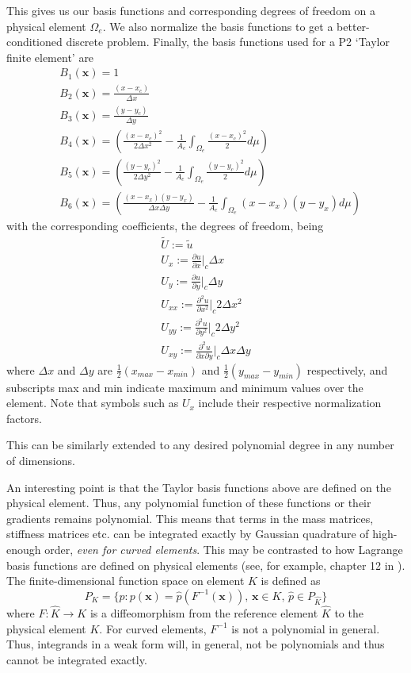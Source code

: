 \documentclass[11pt]{article}
\let\bld\boldsymbol
\begin{document}
This gives us our basis functions and corresponding degrees of freedom on a physical element $\Omega_e$. We also normalize the basis functions to get a better-conditioned discrete problem. Finally, the basis functions used for a P2 `Taylor finite element' are
\begin{align}
&B_1(\bld{x}) = 1 \\
&B_2(\bld{x}) = \frac{(x-x_c)}{\Delta x} \\
&B_3(\bld{x}) = \frac{(y-y_c)}{\Delta y} \\
&B_4(\bld{x}) = \left( \frac{(x-x_c)^2}{2\Delta x^2} - \frac{1}{A_e}\int_{\Omega_e} \frac{(x-x_c)^2}{2}d\mu \right) \\
&B_5(\bld{x}) = \left( \frac{(y-y_c)^2}{2\Delta y^2} -\frac{1}{A_e}\int_{\Omega_e} \frac{(y-y_c)^2}{2}d\mu \right) \\
&B_6(\bld{x}) = \left( \frac{(x-x_x)(y-y_x)}{\Delta x\Delta y} - \frac{1}{A_e}\int_{\Omega_e} (x-x_x)(y-y_x)d\mu \right)
\end{align}
with the corresponding coefficients, the degrees of freedom, being
\begin{align}
\tilde{U} := \tilde{u} \\
U_x := \frac{\partial u}{\partial x}\Big|_c \Delta x \\
U_y := \frac{\partial u}{\partial y}\Big|_c \Delta y \\
U_{xx} := \frac{\partial^2 u}{\partial x^2}\Big|_c 2\Delta x^2 \\
U_{yy} := \frac{\partial^2 u}{\partial y^2}\Big|_c 2\Delta y^2 \\
U_{xy} := \frac{\partial^2 u}{\partial x\partial y}\Big|_c \Delta x\Delta y
\end{align}
where $\Delta x$ and $\Delta y$ are $\frac12 (x_{max}-x_{min})$ and $\frac12 (y_{max}-y_{min})$ respectively, and subscripts max and min indicate maximum and minimum values over the element. Note that symbols such as $U_x$ include their respective normalization factors.

This can be similarly extended to any desired polynomial degree in any number of dimensions.

An interesting point is that the Taylor basis functions above are defined on the physical element. Thus, any polynomial function of these functions or their gradients remains polynomial. This means that terms in the mass matrices, stiffness matrices etc. can be integrated exactly by Gaussian quadrature of high-enough order, \emph{even for curved elements}. This may be contrasted to how Lagrange basis functions are defined on physical elements (see, for example, chapter 12 in \cite{claesjohnson}). The finite-dimensional function space on element $K$ is defined as
\begin{equation}
P_K = \{ p: p(\bld{x}) = \hat{p}(F^{-1}(\bld{x})),\, \bld{x} \in K,\, \hat{p} \in P_{\hat{K}} \}
\end{equation}
where $F:\hat{K}\rightarrow K$ is a diffeomorphism from the reference element $\hat{K}$ to the physical element $K$. For curved elements, $F^{-1}$ is not a polynomial in general. Thus, integrands in a weak form will, in general, not be polynomials and thus cannot be integrated exactly.
\end{document}
